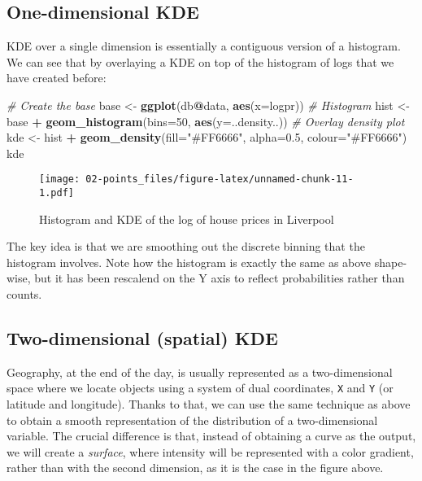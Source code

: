 \documentclass[]{book}
\newenvironment{Shaded}{\begin{snugshade}}{\end{snugshade}}
\newcommand{\CommentTok}[1]{\textcolor[rgb]{0.56,0.35,0.01}{\textit{#1}}}
\newcommand{\DataTypeTok}[1]{\textcolor[rgb]{0.13,0.29,0.53}{#1}}
\newcommand{\DecValTok}[1]{\textcolor[rgb]{0.00,0.00,0.81}{#1}}
\newcommand{\FloatTok}[1]{\textcolor[rgb]{0.00,0.00,0.81}{#1}}
\newcommand{\KeywordTok}[1]{\textcolor[rgb]{0.13,0.29,0.53}{\textbf{#1}}}
\newcommand{\NormalTok}[1]{#1}
\newcommand{\OperatorTok}[1]{\textcolor[rgb]{0.81,0.36,0.00}{\textbf{#1}}}
\newcommand{\StringTok}[1]{\textcolor[rgb]{0.31,0.60,0.02}{#1}}
\begin{document}
\hypertarget{one-dimensional-kde}{%
\subsection{One-dimensional KDE}\label{one-dimensional-kde}}

KDE over a single dimension is essentially a contiguous version of a histogram. We can see that by overlaying a KDE on top of the histogram of logs that we have created before:

\begin{Shaded}
\begin{Highlighting}[]
\CommentTok{# Create the base}
\NormalTok{base <-}\StringTok{ }\KeywordTok{ggplot}\NormalTok{(db}\OperatorTok{@}\NormalTok{data, }\KeywordTok{aes}\NormalTok{(}\DataTypeTok{x=}\NormalTok{logpr))}
\CommentTok{# Histogram}
\NormalTok{hist <-}\StringTok{ }\NormalTok{base }\OperatorTok{+}\StringTok{ }
\StringTok{  }\KeywordTok{geom_histogram}\NormalTok{(}\DataTypeTok{bins=}\DecValTok{50}\NormalTok{, }\KeywordTok{aes}\NormalTok{(}\DataTypeTok{y=}\NormalTok{..density..))}
\CommentTok{# Overlay density plot}
\NormalTok{kde <-}\StringTok{ }\NormalTok{hist }\OperatorTok{+}\StringTok{ }
\StringTok{  }\KeywordTok{geom_density}\NormalTok{(}\DataTypeTok{fill=}\StringTok{"#FF6666"}\NormalTok{, }\DataTypeTok{alpha=}\FloatTok{0.5}\NormalTok{, }\DataTypeTok{colour=}\StringTok{"#FF6666"}\NormalTok{)}
\NormalTok{kde}
\end{Highlighting}
\end{Shaded}

\begin{figure}
\centering
\texttt{[image: 02-points\_files/figure-latex/unnamed-chunk-11-1.pdf]}
\caption{\label{fig:unnamed-chunk-11}Histogram and KDE of the log of house prices in Liverpool}
\end{figure}

The key idea is that we are smoothing out the discrete binning that the histogram involves. Note how the histogram is exactly the same as above shape-wise, but it has been rescalend on the Y axis to reflect probabilities rather than counts.

\hypertarget{two-dimensional-spatial-kde}{%
\subsection{Two-dimensional (spatial) KDE}\label{two-dimensional-spatial-kde}}

Geography, at the end of the day, is usually represented as a two-dimensional space where we locate objects using a system of dual coordinates, \texttt{X} and \texttt{Y} (or latitude and longitude). Thanks to that, we can use the same technique as above to obtain a smooth representation of the distribution of a two-dimensional variable. The crucial difference is that, instead of obtaining a curve as the output, we will create a \emph{surface}, where intensity will be represented with a color gradient, rather than with the second dimension, as it is the case in the figure above.
\end{document}
